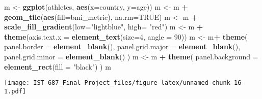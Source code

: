 \documentclass[]{article}
\newenvironment{Shaded}{\begin{snugshade}}{\end{snugshade}}
\newcommand{\DataTypeTok}[1]{\textcolor[rgb]{0.13,0.29,0.53}{#1}}
\newcommand{\DecValTok}[1]{\textcolor[rgb]{0.00,0.00,0.81}{#1}}
\newcommand{\KeywordTok}[1]{\textcolor[rgb]{0.13,0.29,0.53}{\textbf{#1}}}
\newcommand{\NormalTok}[1]{#1}
\newcommand{\OperatorTok}[1]{\textcolor[rgb]{0.81,0.36,0.00}{\textbf{#1}}}
\newcommand{\OtherTok}[1]{\textcolor[rgb]{0.56,0.35,0.01}{#1}}
\newcommand{\StringTok}[1]{\textcolor[rgb]{0.31,0.60,0.02}{#1}}
\begin{document}
\begin{Shaded}
\begin{Highlighting}[]
\NormalTok{m <-}\StringTok{ }\KeywordTok{ggplot}\NormalTok{(athletes, }\KeywordTok{aes}\NormalTok{(}\DataTypeTok{x=}\NormalTok{country, }\DataTypeTok{y=}\NormalTok{age))}
\NormalTok{m <-}\StringTok{ }\NormalTok{m }\OperatorTok{+}\StringTok{ }\KeywordTok{geom_tile}\NormalTok{(}\KeywordTok{aes}\NormalTok{(}\DataTypeTok{fill=}\NormalTok{bmi_metric), }\DataTypeTok{na.rm=}\OtherTok{TRUE}\NormalTok{)}
\NormalTok{m <-}\StringTok{ }\NormalTok{m }\OperatorTok{+}\StringTok{ }\KeywordTok{scale_fill_gradient}\NormalTok{(}\DataTypeTok{low=}\StringTok{"lightblue"}\NormalTok{, }\DataTypeTok{high=} \StringTok{"red"}\NormalTok{) }
\NormalTok{m <-}\StringTok{ }\NormalTok{m }\OperatorTok{+}\StringTok{ }\KeywordTok{theme}\NormalTok{(}\DataTypeTok{axis.text.x =} \KeywordTok{element_text}\NormalTok{(}\DataTypeTok{size=}\DecValTok{4}\NormalTok{, }\DataTypeTok{angle =} \DecValTok{90}\NormalTok{))}
\NormalTok{m <-}\StringTok{ }\NormalTok{m}\OperatorTok{+}\StringTok{ }\KeywordTok{theme}\NormalTok{(}
  \DataTypeTok{panel.border =} \KeywordTok{element_blank}\NormalTok{(),}
  \DataTypeTok{panel.grid.major =} \KeywordTok{element_blank}\NormalTok{(),}
  \DataTypeTok{panel.grid.minor =} \KeywordTok{element_blank}\NormalTok{()}
\NormalTok{)}
\NormalTok{m <-}\StringTok{ }\NormalTok{m }\OperatorTok{+}\StringTok{ }\KeywordTok{theme}\NormalTok{(}
  \DataTypeTok{panel.background =} \KeywordTok{element_rect}\NormalTok{(}\DataTypeTok{fill =} \StringTok{"black"}\NormalTok{)}
\NormalTok{)}
\NormalTok{m}
\end{Highlighting}
\end{Shaded}

\texttt{[image: IST-687\_Final-Project\_files/figure-latex/unnamed-chunk-16-1.pdf]}
\end{document}
